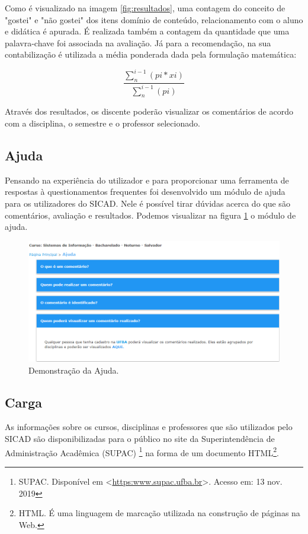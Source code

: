 \documentclass[12pt, a4paper]{report}
\begin{document}
Como é visualizado na imagem \ref{fig:resultados}, uma contagem do conceito de "gostei" e "não gostei" dos itens domínio de conteúdo, relacionamento com o aluno e didática é apurada. É realizada também a contagem da quantidade que uma palavra-chave foi associada na avaliação. Já para a recomendação, na sua contabilização é utilizada a média ponderada dada pela formulação matemática:

\begin{equation}
\frac{\sum_{n}^{i-1}(pi*xi)}{\sum_{n}^{i-1}(pi)} 
\end{equation}

Através dos resultados, os discente poderão visualizar os comentários de acordo com a disciplina, o semestre e o professor selecionado.

\subsection{Ajuda}

Pensando na experiência do utilizador e para proporcionar uma ferramenta de respostas à questionamentos frequentes foi desenvolvido um módulo de ajuda para os utilizadores do SICAD. Nele é possível tirar dúvidas acerca do que são comentários, avaliação e resultados. Podemos visualizar na figura \ref{fig:ajuda} o módulo de ajuda.

\begin{figure}
\centering
\includegraphics[scale=0.6]{ajuda.png}
\caption{Demonstração da Ajuda.}
\label{fig:ajuda}
\end{figure}

\subsection{Carga}
As informações sobre os cursos, disciplinas e professores que são utilizados pelo SICAD são disponibilizadas para o público no site da Superintendência de Administração Acadêmica (SUPAC) \footnote{SUPAC. Disponível em <\url{https:www.supac.ufba.br}>. Acesso em: 13 nov. 2019} na forma de um documento HTML\footnote{HTML. É  uma linguagem de marcação utilizada na construção de páginas na Web.}.
\end{document}
